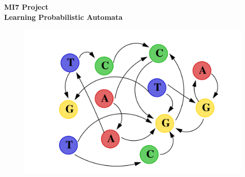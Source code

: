\begin{titlepage}

\begin{center}

\textup{\small {\bf MI7 Project}}\\[0.2in]

\Large \textbf {Learning Probabilistic Automata}\\[0.5in]

\begin{figure}[!h]
\centering
\includegraphics[width=1\linewidth]{pictures/Frontpage}
\label{fig:Frontpage}
\end{figure}


\end{center}

\end{titlepage}
